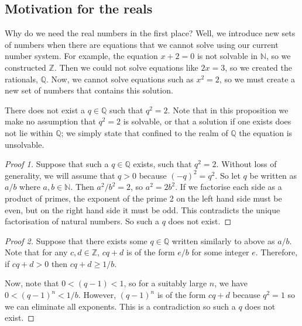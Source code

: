 \subsection{Motivation for the reals}
Why do we need the real numbers in the first place?
Well, we introduce new sets of numbers when there are equations that we cannot solve using our current number system.
For example, the equation \(x+2=0\) is not solvable in \(\mathbb N\), so we constructed \(\mathbb Z\).
Then we could not solve equations like \(2x = 3\), so we created the rationals, \(\mathbb Q\).
Now, we cannot solve equations such as \(x^2 = 2\), so we must create a new set of numbers that contains this solution.

\begin{proposition}
	There does not exist a \(q \in \mathbb Q\) such that \(q^2 = 2\).
	Note that in this proposition we make no assumption that \(q^2 = 2\) is solvable, or that a solution if one exists does not lie within \(\mathbb Q\); we simply state that confined to the realm of \(\mathbb Q\) the equation is unsolvable.
\end{proposition}
\begin{proof}[Proof 1]
	Suppose that such a \(q \in \mathbb Q\) exists, such that \(q^2 = 2\).
	Without loss of generality, we will assume that \(q>0\) because \((-q)^2 = q^2\).
	So let \(q\) be written as \(a/b\) where \(a, b \in \mathbb N\).
	Then \(a^2/b^2 = 2\), so \(a^2 = 2b^2\).
	If we factorise each side as a product of primes, the exponent of the prime 2 on the left hand side must be even, but on the right hand side it must be odd.
	This contradicts the unique factorisation of natural numbers.
	So such a \(q\) does not exist.
\end{proof}
\begin{proof}[Proof 2]
	Suppose that there exists some \(q \in \mathbb Q\) written similarly to above as \(a/b\).
	Note that for any \(c, d \in \mathbb Z\), \(cq + d\) is of the form \(e/b\) for some integer \(e\).
	Therefore, if \(cq+d>0\) then \(cq+d \geq 1/b\).

	Now, note that \(0 < (q - 1) < 1\), so for a suitably large \(n\), we have \(0 < (q - 1)^n < 1/b\).
	However, \((q-1)^n\) is of the form \(cq+d\) because \(q^2 = 1\) so we can eliminate all exponents.
	This is a contradiction so such a \(q\) does not exist.
\end{proof}

